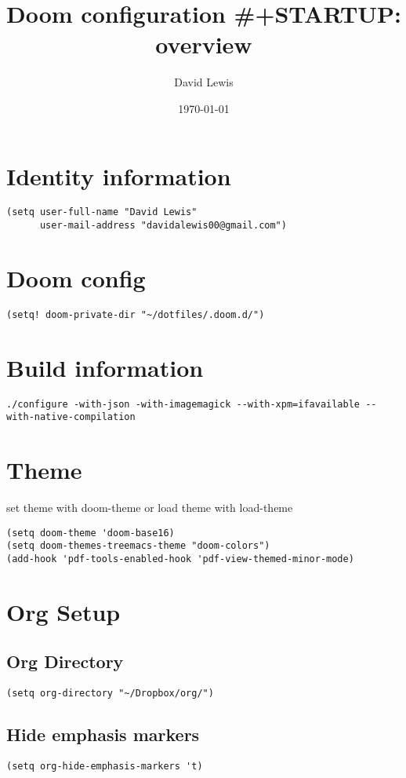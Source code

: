 \documentclass[11pt]{article}
\author{David Lewis}
\date{\today}
\title{Doom configuration \#+STARTUP: overview}
\begin{document}
\maketitle
\section*{Identity information}
\label{sec:orgd36877d}
\begin{verbatim}
(setq user-full-name "David Lewis"
      user-mail-address "davidalewis00@gmail.com")
\end{verbatim}
\section*{Doom config}
\label{sec:orgb551322}
\begin{verbatim}
(setq! doom-private-dir "~/dotfiles/.doom.d/")
\end{verbatim}
\section*{Build information}
\label{sec:org7dcb728}
\begin{verbatim}
./configure -with-json -with-imagemagick --with-xpm=ifavailable --with-native-compilation
\end{verbatim}
\section*{Theme}
\label{sec:org055797f}
set theme with doom-theme or load theme with load-theme
\begin{verbatim}
(setq doom-theme 'doom-base16)
(setq doom-themes-treemacs-theme "doom-colors")
(add-hook 'pdf-tools-enabled-hook 'pdf-view-themed-minor-mode)
\end{verbatim}
\section*{Org Setup}
\label{sec:org937f742}
\subsection*{Org Directory}
\label{sec:org66a2746}
\begin{verbatim}
(setq org-directory "~/Dropbox/org/")
\end{verbatim}
\subsection*{Hide emphasis markers}
\label{sec:org005aab1}
\begin{verbatim}
(setq org-hide-emphasis-markers 't)
\end{verbatim}
\end{document}

